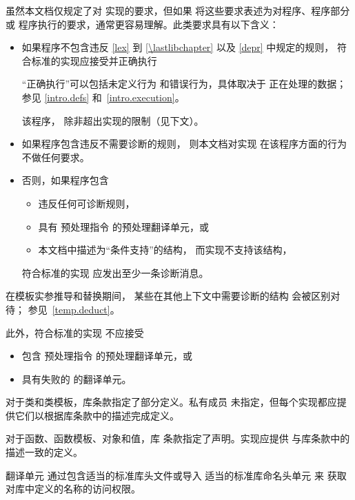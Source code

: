 \pnum
{}%
虽然本文档仅规定了对 \Cpp{}
实现的要求，但如果
将这些要求表述为对程序、程序部分或
程序执行的要求，通常更容易理解。此类要求具有以下含义：
\begin{itemize}
\item
如果程序不包含违反
\ref{lex} 到 \ref{\lastlibchapter} 以及 \ref{depr} 中规定的规则，
符合标准的实现应接受并正确执行
\begin{footnote}
“正确执行”可以包括未定义行为
和错误行为，具体取决于
正在处理的数据；参见 \ref{intro.defs} 和~\ref{intro.execution}。
\end{footnote}
该程序，
除非超出实现的限制（见下文）。
\item
{}%
如果程序包含违反不需要诊断的规则，
则本文档对实现
在该程序方面的行为不做任何要求。

\item
{}%
否则，如果程序包含
\begin{itemize}
\item
违反任何可诊断规则，
\item
具有  预处理指令 的预处理翻译单元，或
\item
本文档中描述为“条件支持”的结构，
而实现不支持该结构，
\end{itemize}
符合标准的实现
应发出至少一条诊断消息。
\end{itemize}
\begin{note}
在模板实参推导和替换期间，
某些在其他上下文中需要诊断的结构
会被区别对待；
参见~\ref{temp.deduct}。
\end{note}
此外，符合标准的实现
不应接受
\begin{itemize}
\item
包含  预处理指令 的预处理翻译单元，或
\item
具有失败的  的翻译单元。
\end{itemize}
\pnum
{}%
%
%
对于类和类模板，库条款指定了部分定义。私有成员
未指定，但每个实现都应提供它们以根据库条款中的描述完成定义。

\pnum
对于函数、函数模板、对象和值，库
条款指定了声明。实现应提供
与库条款中的描述一致的定义。

\pnum
\Cpp{} 翻译单元
通过包含适当的标准库头文件或导入
适当的标准库命名头单元 来
获取对库中定义的名称的访问权限。

